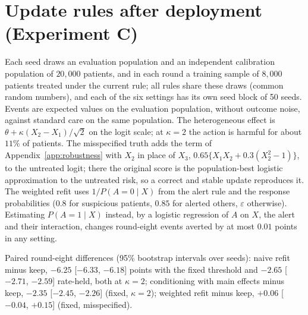 \documentclass[letterpaper]{article} %
\begin{document}
\section{Update rules after deployment (Experiment C)}
\label{app:retrain}
Each seed draws an evaluation population and an independent calibration
population of $20{,}000$ patients, and in each round a training sample of
$8{,}000$ patients treated under the current rule; all rules share these draws
(common random numbers), and each of the six settings has its own seed block
of 50 seeds. Events are expected values on the evaluation population, without
outcome noise, against standard care on the same population. The
heterogeneous effect is $\theta + \kappa (X_2 - X_1)/\sqrt{2}$ on the logit
scale; at $\kappa = 2$ the action is harmful for about $11\%$ of patients. The
misspecified truth adds the term of Appendix~\ref{app:robustness} with $X_2$ in place of $X_3$, $0.65\{X_1X_2 + 0.3(X_2^2 - 1)\}$, to the
untreated logit; there the original score is the population-best logistic
approximation to the untreated risk, so a correct and stable update
reproduces it. The weighted refit uses $1/P(A = 0 \mid X)$ from the alert rule
and the response probabilities ($0.8$ for suspicious patients, $0.85$ for
alerted others, $\varepsilon$ otherwise). Estimating $P(A = 1 \mid X)$ instead,
by a logistic regression of $A$ on $X$, the alert and their interaction, changes
round-eight events averted by at most $0.01$ points in any setting.


Paired round-eight differences (95\% bootstrap intervals over seeds): naive
refit minus keep, $-6.25$ [$-6.33$, $-6.18$] points with the fixed threshold
and $-2.65$ [$-2.71$, $-2.59$] rate-held, both at $\kappa = 2$; conditioning
with main effects minus keep, $-2.35$ [$-2.45$, $-2.26$] (fixed, $\kappa = 2$);
weighted refit minus keep, $+0.06$ [$-0.04$, $+0.15$] (fixed, misspecified).
\end{document}
